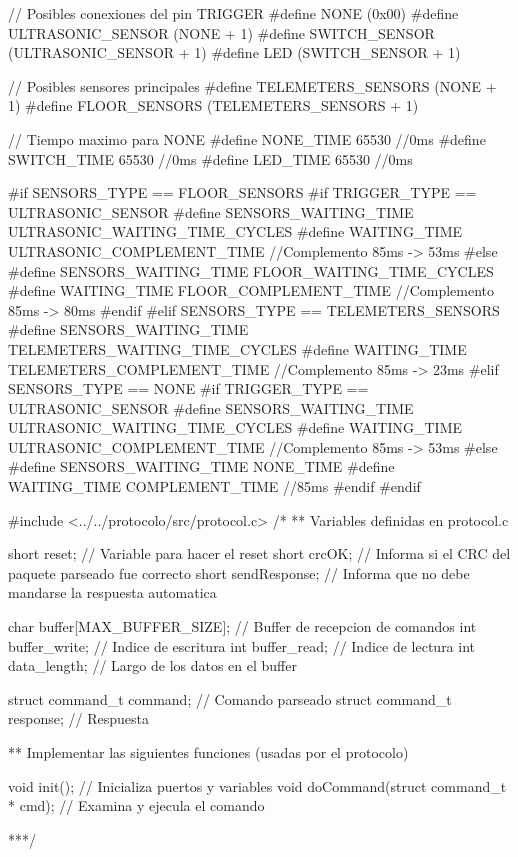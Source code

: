 {\begin{verbatimtab}
// Posibles conexiones del pin TRIGGER
#define NONE			  (0x00)
#define ULTRASONIC_SENSOR (NONE + 1)
#define SWITCH_SENSOR     (ULTRASONIC_SENSOR + 1)
#define LED				  (SWITCH_SENSOR + 1)

// Posibles sensores principales
#define TELEMETERS_SENSORS (NONE + 1)
#define FLOOR_SENSORS      (TELEMETERS_SENSORS + 1)

// Tiempo maximo para NONE
#define NONE_TIME	65530 //0ms
#define SWITCH_TIME 65530 //0ms
#define LED_TIME 	65530 //0ms

#if SENSORS_TYPE == FLOOR_SENSORS
	#if TRIGGER_TYPE == ULTRASONIC_SENSOR
		#define SENSORS_WAITING_TIME ULTRASONIC_WAITING_TIME_CYCLES
		#define WAITING_TIME ULTRASONIC_COMPLEMENT_TIME //Complemento 85ms -> 53ms
	#else
		#define SENSORS_WAITING_TIME FLOOR_WAITING_TIME_CYCLES
		#define WAITING_TIME FLOOR_COMPLEMENT_TIME //Complemento 85ms -> 80ms
	#endif
#elif SENSORS_TYPE == TELEMETERS_SENSORS
	#define SENSORS_WAITING_TIME TELEMETERS_WAITING_TIME_CYCLES
	#define WAITING_TIME TELEMETERS_COMPLEMENT_TIME //Complemento 85ms -> 23ms
#elif SENSORS_TYPE == NONE
	#if TRIGGER_TYPE == ULTRASONIC_SENSOR
		#define SENSORS_WAITING_TIME ULTRASONIC_WAITING_TIME_CYCLES
		#define WAITING_TIME ULTRASONIC_COMPLEMENT_TIME //Complemento 85ms -> 53ms
	#else
		#define SENSORS_WAITING_TIME NONE_TIME
		#define WAITING_TIME COMPLEMENT_TIME //85ms
	#endif
#endif

#include <../../protocolo/src/protocol.c>
/*
** Variables definidas en protocol.c

short reset; // Variable para hacer el reset
short crcOK; // Informa si el CRC del paquete parseado fue correcto
short sendResponse; // Informa que no debe mandarse la respuesta automatica

char buffer[MAX_BUFFER_SIZE];	// Buffer de recepcion de comandos
int buffer_write;				// Indice de escritura
int buffer_read;				// Indice de lectura
int data_length;				// Largo de los datos en el buffer

struct command_t command; 	// Comando parseado
struct command_t response; 	// Respuesta

** Implementar las siguientes funciones (usadas por el protocolo)

void init(); // Inicializa puertos y variables
void doCommand(struct command_t * cmd); // Examina y ejecula el comando

***/


\end{verbatimtab}}

